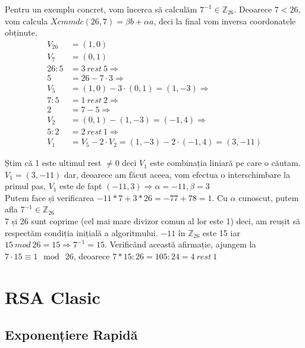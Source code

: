 \documentclass[12pt, oneside]{book}
\begin{document}
    Pentru un exemplu concret, vom încerca să calculăm $7^{-1} \in \mathbb{Z}_{26}$.
    Deoarece $ 7 < 26$, vom calcula $Xcmmdc(26,7)= \beta b + \alpha a$, deci la final vom inversa coordonatele obținute.
    \begin{align*}
    V_{26} &=(1,0) \\
    V_{7} &=(0,1) \\
    26 : 5 &= 3 \ rest \ 5 \Rightarrow \\
    5 &= 26 -7 \cdot 3 \Rightarrow \\
    V_5 &= (1,0) - 3 \cdot (0,1) = (1,-3) \Rightarrow \\
    7 :5 &= 1 \ rest \ 2  \Rightarrow \\
    2 &= 7-5 \Rightarrow \\
    V_2 &= (0,1) - (1,-3) = (-1,4) \Rightarrow \\
    5:2 &= 2 \ rest \ 1 \Rightarrow \\
    V_1 &= V_5 - 2 \cdot V_2 = (1,-3) - 2 \cdot (-1,4)= (3,-11)
    \end{align*}
    
    Știm că 1 este ultimul rest $\neq 0$ deci $V_1$ este combinația liniară pe care o căutam. $V_1 = (3,-11)$ dar, deoarece am făcut aceea, vom efectua o interschimbare la primul pas, $V_1$ este de fapt $(-11,3) \Rightarrow \alpha = -11 , \beta=3$ \\
    Putem face și verificarea $ -11 * 7 + 3 * 26 = -77 + 78  =1 $.
     Cu $ \alpha $ cunoscut, putem afla $ 7^{-1} \in \mathbb{Z}_{26} $ \\
     7 și 26 sunt coprime (cel mai mare divizor comun al lor este 1) deci, am reușit să respectăm condiția inițială a algoritmului. $-11$ în $\mathbb{Z}_{26}$ este 15 iar $15 \ mod \ 26 = 15 \Rightarrow 7^{-1} = 15$. Verificând această afirmație, ajungem la $7 \cdot 15 \equiv 1 \mod \ 26$, deoarece $7*15 : 26 = 105 : 24 = 4 \ rest \ 1$ \\
     
    
    \section{RSA Clasic}
     \subsection{Exponențiere Rapidă}
\end{document}
